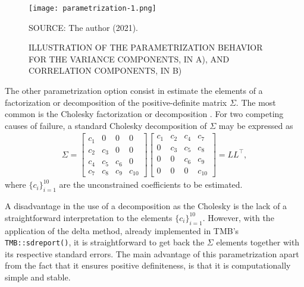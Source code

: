 \begin{figure}[H]
 \setlength{\abovecaptionskip}{.0001pt}
 \caption{ILLUSTRATION OF THE PARAMETRIZATION BEHAVIOR FOR THE VARIANCE
          COMPONENTS, IN A), AND CORRELATION COMPONENTS, IN B)}
 \vspace{0.2cm}\centering
 \texttt{[image: parametrization-1.png]}\\
 \begin{footnotesize}
  SOURCE: The author (2021).
 \end{footnotesize}
 \label{fig:parametrization}
\end{figure}

The other parametrization option consist in estimate the elements of a
factorization or decomposition of the positive-definite matrix
\(\Sigma\). The most common is the Cholesky factorization or
decomposition \cite{cholesky}. For two competing causes of failure, a
standard Cholesky decomposition of \(\Sigma\) may be expressed as
\begin{align*}
 \Sigma = \begin{bmatrix}
           c_{1}&0&0&0\\
           c_{2}&c_{3}&0&0\\
           c_{4}&c_{5}&c_{6}&0\\
           c_{7}&c_{8}&c_{9}&c_{10}
         \end{bmatrix}\begin{bmatrix}
                       c_{1}&c_{2}&c_{4}&c_{7}\\
                       0&c_{3}&c_{5}&c_{8}\\
                       0&0&c_{6}&c_{9}\\
                       0&0&0&c_{10}
                      \end{bmatrix} = LL^{\top},
\end{align*}
where \(\{c_{i}\}_{i=1}^{10}\) are the unconstrained coefficients to be
estimated.

A disadvantage in the use of a decomposition as the Cholesky is the lack
of a straightforward interpretation to the elements
\(\{c_{i}\}_{i=1}^{10}\). However, with the application of the delta
method, already implemented in TMB's \cite{TMB}
\texttt{TMB::sdreport()}, it is straightforward to get back the
\(\Sigma\) elements together with its respective standard errors. The
main advantage of this parametrization apart from the fact that it
ensures positive definiteness, is that it is computationally simple and
stable.

